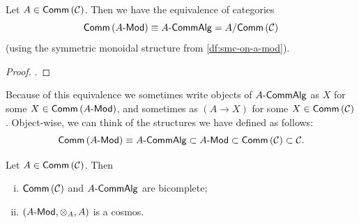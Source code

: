        \begin{lemma}\label{le:two-definitions-of-alg}
            Let $A\in\mathsf{Comm}\left({\mathcal{C}}\right)$.
            Then we have the equivalence of categories
            \begin{equation*}
                \mathsf{Comm}\left({{{A}\hbox{-}\mathsf{Mod}}}\right) \equiv {{A}\hbox{-}\mathsf{CommAlg}} = A/\mathsf{Comm}\left({\mathcal{C}}\right)
            \end{equation*}
            (using the symmetric monoidal structure from \cref{df:smc-on-a-mod}).
        \end{lemma}

        \begin{proof}
            \cite[Proposition~1.2.15,~\S1.2,~p.14]{Marty:2009tj}.
        \end{proof}

        Because of this equivalence we sometimes write objects of ${{A}\hbox{-}\mathsf{CommAlg}}$ as $X$ for some $X\in\mathsf{Comm}\left({{{A}\hbox{-}\mathsf{Mod}}}\right)$, and sometimes as $(A\to X)$ for some $X\in\mathsf{Comm}\left({\mathcal{C}}\right)$.
        Object-wise, we can think of the structures we have defined as follows:
        \begin{equation*}
            \mathsf{Comm}\left({{{A}\hbox{-}\mathsf{Mod}}}\right)\equiv{{A}\hbox{-}\mathsf{CommAlg}}\subset{{A}\hbox{-}\mathsf{Mod}}\subset\mathsf{Comm}\left({\mathcal{C}}\right)\subset\mathcal{C}.
        \end{equation*}





        \begin{corollary}\label{le:modc-a-cosmos-algc-a-bicomplete}
            Let $A\in\mathsf{Comm}\left({\mathcal{C}}\right)$.
            Then
            \begin{enumerate}[(i)]
                \item $\mathsf{Comm}\left({\mathcal{C}}\right)$ and ${{A}\hbox{-}\mathsf{CommAlg}}$ are bicomplete;
                \item $({{A}\hbox{-}\mathsf{Mod}},\otimes_A,A)$ is a cosmos.\qedhere
            \end{enumerate}
        \end{corollary}

